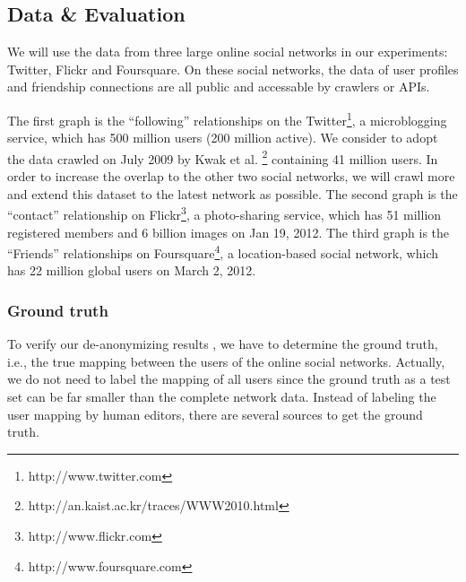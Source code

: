 \documentclass[11pt,letterpaper]{article}
\begin{document}
\subsection{Data \& Evaluation}
\label{datasection}
We will use the data from three large online social networks in our experiments: Twitter, Flickr and Foursquare. On these social networks, the data of user profiles and friendship connections are all public and accessable by crawlers or APIs. 

The first graph is the ``following'' relationships on the Twitter\footnote{http://www.twitter.com}, a microblogging service, which has 500 million users (200 million active). We consider to adopt the data crawled  on July 2009 by Kwak et al. \footnote{http://an.kaist.ac.kr/traces/WWW2010.html} containing 41 million users. In order to increase the overlap to the other two social networks, we will crawl more and extend this dataset to the latest network as possible. 
The second graph is the ``contact'' relationship on Flickr\footnote{http://www.flickr.com}, a photo-sharing service, which has 51 million registered members and 6 billion images on Jan 19, 2012.
The third graph is the ``Friends'' relationships on Foursquare\footnote{http://www.foursquare.com}, a location-based social network, which has 22 million global users on March 2, 2012. 


\subsubsection{Ground truth}

To verify our de-anonymizing results , we have to determine the ground truth, i.e., the true mapping between the users of the online social networks. Actually, we do not need to label the mapping of all users since the ground truth as a test set can be far smaller than the complete network data.
Instead of labeling the user mapping by human editors, there are several sources to get the ground truth. 
\end{document}
